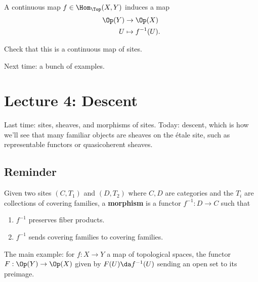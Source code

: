 \begin{example}[?]

A continuous map \(f\in \Hom_\Top(X, Y)\) induces a map
\begin{align*}  
\Op(Y) &\to \Op(X) \\
U &\mapsto f^{-1}(U)
.\end{align*}

\end{example}

\begin{exercise}[?]

Check that this is a continuous map of sites.

\end{exercise}

Next time: a bunch of examples.

\hypertarget{lecture-4-descent}{%
\section{Lecture 4: Descent}\label{lecture-4-descent}}

Last time: sites, sheaves, and morphisms of sites. Today: descent, which
is how we'll see that many familiar objects are sheaves on the étale
site, such as representable functors or quasicoherent sheaves.

\hypertarget{reminder}{%
\subsection{Reminder}\label{reminder}}

\begin{definition}

Given two sites \((C, T_1)\) and \((D, T_2)\) where \(C, D\) are
categories and the \(T_i\) are collections of covering families, a
\textbf{morphism} is a functor \(f^{-1} :D\to C\) such that

\begin{enumerate}
\def\labelenumi{\arabic{enumi}.}
\tightlist
\item
  \(f^{-1}\) preserves fiber products.
\item
  \(f^{-1}\) sends covering families to covering families.
\end{enumerate}

\end{definition}

\begin{example}[?]

The main example: for \(f:X\to Y\) a map of topological spaces, the
functor \(F: \Op(Y) \to \Op(X)\) given by \(F(U) \da f^{-1}(U)\) sending
an open set to its preimage.

\end{example}

